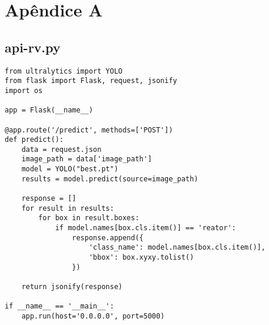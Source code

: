 
\chapter{Apêndice A}
\label{chap:script-api}

\section{api-rv.py}


\begin{lstlisting}
from ultralytics import YOLO
from flask import Flask, request, jsonify
import os

app = Flask(__name__)

@app.route('/predict', methods=['POST'])
def predict():
    data = request.json
    image_path = data['image_path']
    model = YOLO("best.pt")
    results = model.predict(source=image_path)

    response = []
    for result in results:
        for box in result.boxes:
            if model.names[box.cls.item()] == 'reator':
                response.append({
                    'class_name': model.names[box.cls.item()],
                    'bbox': box.xyxy.tolist()
                })

    return jsonify(response)

if __name__ == '__main__':
    app.run(host='0.0.0.0', port=5000)
\end{lstlisting}
